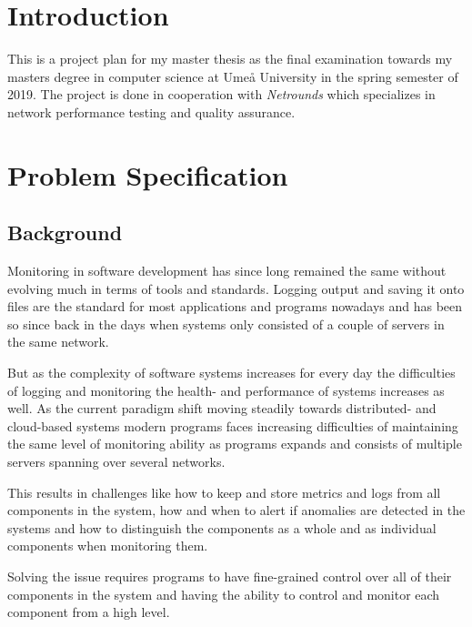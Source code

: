 \documentclass[10pt, titlepage, oneside, a4paper]{article}
\begin{document}
	\newpage

	
	\setlength{\parindent}{0pt}
	\setlength{\parskip}{10pt}
	
\tableofcontents
\newpage

\section{Introduction}

This is a project plan for my master thesis as the final examination towards my masters degree in computer science at Umeå University in the spring semester of 2019. The project is done in cooperation with \textit{Netrounds} which specializes in network performance testing and quality assurance. 

\section{Problem Specification}

\subsection{Background}

Monitoring in software development has since long remained the same without evolving much in terms of tools and standards. Logging output and saving it onto files are the standard for most applications and programs nowadays and has been so since back in the days when systems only consisted of a couple of servers in the same network.

But as the complexity of software systems increases for every day the difficulties of logging and monitoring the health- and performance of systems increases as well. As the current paradigm shift moving steadily towards distributed- and cloud-based systems modern programs faces increasing difficulties of maintaining the same level of monitoring ability as programs expands and consists of multiple servers spanning over several networks.

This results in challenges like how to keep and store metrics and logs from all components in the system, how and when to alert if anomalies are detected in the systems and how to distinguish the components as a whole and as individual components when monitoring them.

Solving the issue requires programs to have fine-grained control over all of their components in the system and having the ability to control and monitor each component from a high level.  
\end{document}
